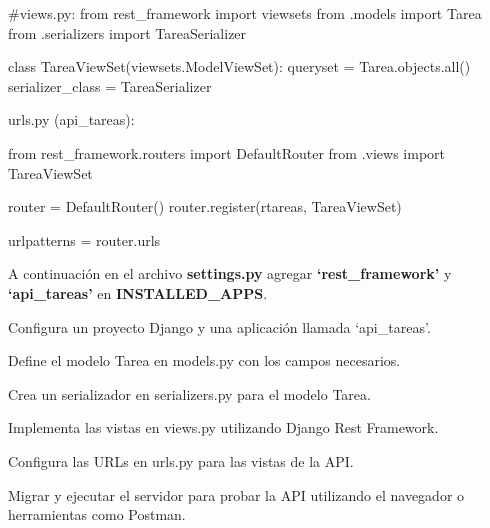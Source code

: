 \documentclass[
  a4paper,
  DIV=11,
  numbers=noendperiod,
  onepage,
  openany]{scrreprt}
\newenvironment{Shaded}{\begin{snugshade}}{\end{snugshade}}
\newcommand{\BuiltInTok}[1]{\textcolor[rgb]{0.00,0.23,0.31}{#1}}
\newcommand{\CommentTok}[1]{\textcolor[rgb]{0.37,0.37,0.37}{#1}}
\newcommand{\ImportTok}[1]{\textcolor[rgb]{0.00,0.46,0.62}{#1}}
\newcommand{\KeywordTok}[1]{\textcolor[rgb]{0.00,0.23,0.31}{#1}}
\newcommand{\NormalTok}[1]{\textcolor[rgb]{0.00,0.23,0.31}{#1}}
\newcommand{\OperatorTok}[1]{\textcolor[rgb]{0.37,0.37,0.37}{#1}}
\newcommand{\VerbatimStringTok}[1]{\textcolor[rgb]{0.13,0.47,0.30}{#1}}
\begin{document}
\begin{Shaded}
\begin{Highlighting}[]
\CommentTok{\#views.py:}
\ImportTok{from}\NormalTok{ rest\_framework }\ImportTok{import}\NormalTok{ viewsets}
\ImportTok{from}\NormalTok{ .models }\ImportTok{import}\NormalTok{ Tarea}
\ImportTok{from}\NormalTok{ .serializers }\ImportTok{import}\NormalTok{ TareaSerializer}

\KeywordTok{class}\NormalTok{ TareaViewSet(viewsets.ModelViewSet):}
\NormalTok{    queryset }\OperatorTok{=}\NormalTok{ Tarea.objects.}\BuiltInTok{all}\NormalTok{()}
\NormalTok{    serializer\_class }\OperatorTok{=}\NormalTok{ TareaSerializer}

\NormalTok{    urls.py (api\_tareas):}
\end{Highlighting}
\end{Shaded}

\begin{Shaded}
\begin{Highlighting}[]
\ImportTok{from}\NormalTok{ rest\_framework.routers }\ImportTok{import}\NormalTok{ DefaultRouter}
\ImportTok{from}\NormalTok{ .views }\ImportTok{import}\NormalTok{ TareaViewSet}

\NormalTok{router }\OperatorTok{=}\NormalTok{ DefaultRouter()}
\NormalTok{router.register(}\VerbatimStringTok{r\textquotesingle{}tareas\textquotesingle{}}\NormalTok{, TareaViewSet)}

\NormalTok{urlpatterns }\OperatorTok{=}\NormalTok{ router.urls}
\end{Highlighting}
\end{Shaded}

A continuación en el archivo \textbf{settings.py} agregar
\textbf{`rest\_framework'} y \textbf{`api\_tareas'} en
\textbf{INSTALLED\_APPS}.

\begin{tcolorbox}[enhanced jigsaw, colbacktitle=quarto-callout-important-color!10!white, toprule=.15mm, leftrule=.75mm, titlerule=0mm, opacityback=0, rightrule=.15mm, opacitybacktitle=0.6, breakable, left=2mm, coltitle=black, title=\textcolor{quarto-callout-important-color}{\faExclamation}\hspace{0.5em}{Actividad Práctica:}, toptitle=1mm, bottomtitle=1mm, arc=.35mm, bottomrule=.15mm, colback=white, colframe=quarto-callout-important-color-frame]

Configura un proyecto Django y una aplicación llamada `api\_tareas'.

Define el modelo Tarea en models.py con los campos necesarios.

Crea un serializador en serializers.py para el modelo Tarea.

Implementa las vistas en views.py utilizando Django Rest Framework.

Configura las URLs en urls.py para las vistas de la API.

Migrar y ejecutar el servidor para probar la API utilizando el navegador
o herramientas como Postman.

\end{tcolorbox}
\end{document}
